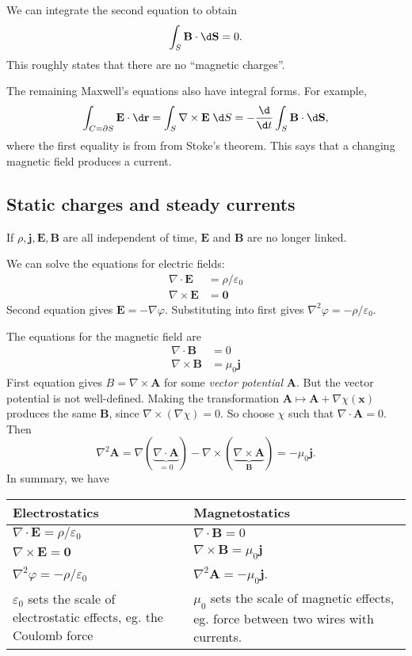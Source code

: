 \documentclass[a4paper]{article}
\begin{document}
We can integrate the second equation to obtain
\[
  \int_S \mathbf{B}\cdot \d \mathbf{S} = 0.
\]
This roughly states that there are no ``magnetic charges''.

The remaining Maxwell's equations also have integral forms. For example,
\[
  \int_{C = \partial S} \mathbf{E}\cdot \d \mathbf{r} = \int_S \nabla \times \mathbf{E}\;\d S = -\frac{\d }{\d t}\int_S \mathbf{B}\cdot \d \mathbf{S},
\]
where the first equality is from from Stoke's theorem. This says that a changing magnetic field produces a current.

\subsection{Static charges and steady currents}
If $\rho, \mathbf{j}, \mathbf{E}, \mathbf{B}$ are all independent of time, $\mathbf{E}$ and $\mathbf{B}$ are no longer linked.

We can solve the equations for electric fields:
\begin{align*}
  \nabla\cdot \mathbf{E} &= \rho/\varepsilon_0\\
  \nabla\times \mathbf{E} &= \mathbf{0}
\end{align*}
Second equation gives $\mathbf{E} = -\nabla \varphi$. Substituting into first gives $\nabla^2 \varphi = -\rho/\varepsilon_0$.

The equations for the magnetic field are
\begin{align*}
  \nabla\cdot \mathbf{B} &= 0\\
  \nabla\times \mathbf{B} &= \mu_0 \mathbf{j}
\end{align*}
First equation gives $B = \nabla \times \mathbf{A}$ for some \emph{vector potential} $\mathbf{A}$. But the vector potential is not well-defined. Making the transformation $\mathbf{A}\mapsto \mathbf{A} + \nabla \chi(\mathbf{x})$ produces the same $\mathbf{B}$, since $\nabla\times (\nabla \chi) = 0$. So choose $\chi$ such that $\nabla\cdot \mathbf{A} = 0$. Then
\[
  \nabla^2 \mathbf{A} = \nabla(\underbrace{\nabla\cdot \mathbf{A}}_{=0}) - \nabla\times (\underbrace{\nabla\times \mathbf{A}}_{\mathbf{B}}) = -\mu_0 \mathbf{j}.
\]
In summary, we have
\begin{center}
  \begin{tabularx}{\textwidth}{XX}
    \toprule
    Electrostatics & Magnetostatics\\
    \midrule
    $\nabla\cdot \mathbf{E} = \rho/\varepsilon_0$ & $\nabla\cdot \mathbf{B} = 0$\\
    $\nabla\times \mathbf{E} = \mathbf{0}$ & $\nabla\times \mathbf{B} = \mu_0 \mathbf{j}$\\
    $\nabla^2 \varphi = -\rho/\varepsilon_0$ & $\nabla^2 \mathbf{A} = -\mu_0 \mathbf{j}$.\\
    $\varepsilon_0$ sets the scale of electrostatic effects, eg. the Coulomb force & $\mu_0$ sets the scale of magnetic effects, eg. force between two wires with currents.\\
    \bottomrule
  \end{tabularx}
\end{center}
\end{document}
